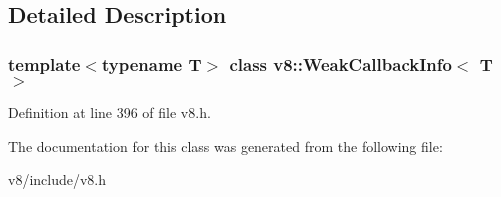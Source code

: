 \subsection{Detailed Description}
\subsubsection*{template$<$typename T$>$\newline
class v8\+::\+Weak\+Callback\+Info$<$ T $>$}



Definition at line 396 of file v8.\+h.



The documentation for this class was generated from the following file\+:\begin{DoxyCompactItemize}
\item 
v8/include/v8.\+h\end{DoxyCompactItemize}
